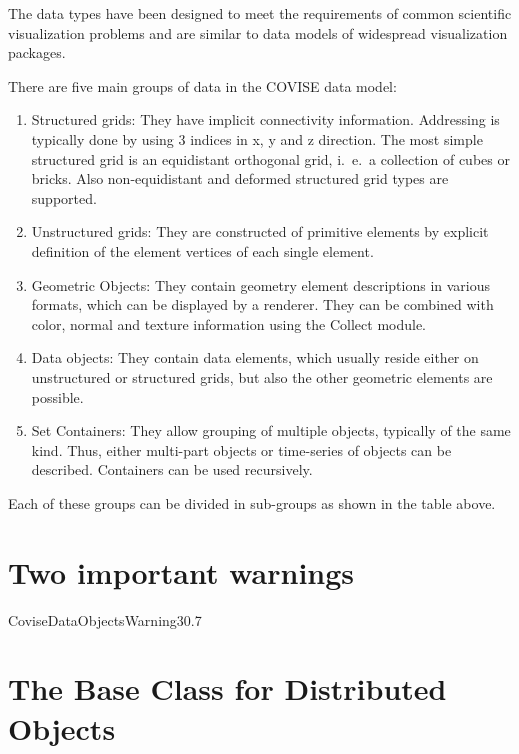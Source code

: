 The data types have been designed to meet the requirements of common scientific 
visualization problems and are similar to data models of widespread
visualization packages.

 
There are five main groups of data in the COVISE data model: 

\begin{enumerate}
\item Structured grids: They have implicit connectivity information. Addressing 
is  typically done by using 3 indices in x, y and z direction. The most simple 
structured grid is an equidistant orthogonal grid, i.~e.\ a collection of cubes 
or bricks. Also non-equidistant and deformed structured grid types are supported.
\item Unstructured grids: They are constructed of primitive elements by explicit 
definition of the element vertices of each single element.
\item Geometric Objects: They contain geometry element descriptions in various 
formats, which can be displayed by a renderer. They can be combined with color, 
normal and texture information using the Collect module.
\item Data  objects: They contain data elements, which usually reside either on
unstructured or structured grids, but also the other geometric elements are
possible.
\item Set Containers: They allow grouping of multiple objects, typically of the same 
kind. Thus, either multi-part objects or time-series of objects can be described. 
Containers can be used recursively.
\end{enumerate}

Each of these groups can be divided in sub-groups as shown in the table above. 


\section{Two important warnings}

\begin{covimgpath}{CoviseDataObjects}{Warning3}{0.7}\end{covimgpath}
 

\section{The Base Class for Distributed Objects}

